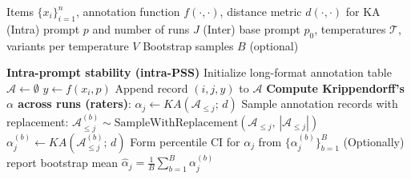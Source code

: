 \begin{algorithm}[t]
\caption{Prompt Stability Scoring (PSS): where Krippendorff's $\alpha$ is computed (with bootstrap matching Python implementation)}
\label{alg:pss_ka_where_bootstrap_python}
\begin{algorithmic}[1]
\Require Items $\{x_i\}_{i=1}^n$, annotation function $f(\cdot,\cdot)$, distance metric $d(\cdot,\cdot)$ for KA
\Require (Intra) prompt $p$ and number of runs $J$
\Require (Inter) base prompt $p_0$, temperatures $\mathcal{T}$, variants per temperature $V$
\Require Bootstrap samples $B$ (optional)
\vspace{2mm}

\Statex \textbf{Intra-prompt stability (intra-PSS)}
\State Initialize long-format annotation table $\mathcal{A} \gets \emptyset$
        \State $y \gets f(x_i, p)$
        \State Append record $(i, j, y)$ to $\mathcal{A}$
    \EndFor
        \State \textbf{Compute Krippendorff's $\alpha$ across runs (raters)}:
        \State \hspace{5mm} $\alpha_j \gets KA\!\left(\mathcal{A}_{\le j};\, d\right)$
                \State Sample annotation records with replacement:
                \State \hspace{5mm} $\mathcal{A}^{(b)}_{\le j} \sim \text{SampleWithReplacement}\!\left(\mathcal{A}_{\le j},\,|\mathcal{A}_{\le j}|\right)$
                \State $\alpha^{(b)}_j \gets KA\!\left(\mathcal{A}^{(b)}_{\le j};\, d\right)$
            \EndFor
            \State Form percentile CI for $\alpha_j$ from $\{\alpha^{(b)}_j\}_{b=1}^B$
            \State (Optionally) report bootstrap mean $\widehat{\alpha}_j = \frac{1}{B}\sum_{b=1}^B \alpha^{(b)}_j$
        \EndIf
    \EndIf
\EndFor
\Statex {}


\end{algorithmic}
\end{algorithm}
